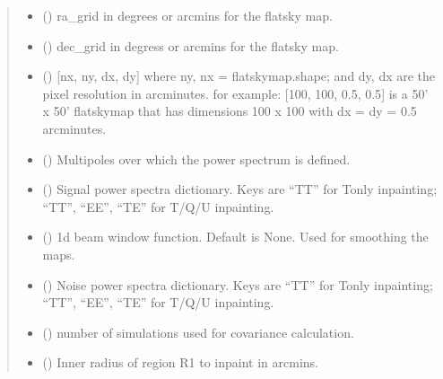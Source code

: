 \documentclass[letterpaper,10pt,english]{sphinxmanual}
\begin{document}
\begin{fulllineitems}
\begin{quote}
\begin{description}
\begin{itemize}
\item {} 
\sphinxAtStartPar
{} () \textendash{} ra\_grid in degrees or arcmins for the flatsky map.

\item {} 
\sphinxAtStartPar
{} () \textendash{} dec\_grid in degress or arcmins for the flatsky map.

\item {} 
\sphinxAtStartPar
{} () \textendash{} {[}nx, ny, dx, dy{]} where ny, nx = flatskymap.shape; and dy, dx are the pixel resolution in arcminutes.
for example: {[}100, 100, 0.5, 0.5{]} is a 50’ x 50’ flatskymap that has dimensions 100 x 100 with dx = dy = 0.5 arcminutes.

\item {} 
\sphinxAtStartPar
{} () \textendash{} Multipoles over which the power spectrum is defined.

\item {} 
\sphinxAtStartPar
{} () \textendash{} Signal power spectra dictionary.
Keys are “TT” for T\sphinxhyphen{}only inpainting;
“TT”, “EE”, “TE” for T/Q/U inpainting.

\item {} 
\sphinxAtStartPar
{} () \textendash{} 1d beam window function.
Default is None. Used for smoothing the maps.

\item {} 
\sphinxAtStartPar
{} () \textendash{} Noise power spectra dictionary.
Keys are “TT” for T\sphinxhyphen{}only inpainting;
“TT”, “EE”, “TE” for T/Q/U inpainting.

\item {} 
\sphinxAtStartPar
{} () \textendash{} number of simulations used for covariance calculation.

\item {} 
\sphinxAtStartPar
{} () \textendash{} Inner radius of region R1 to inpaint in arcmins.


\end{itemize}
\end{description}
\end{quote}
\end{fulllineitems}
\end{document}
